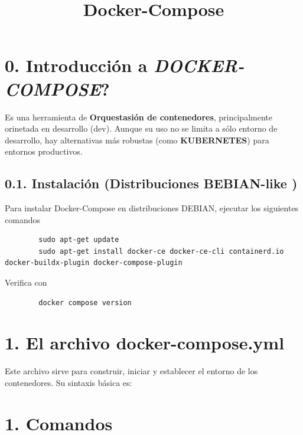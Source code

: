 \documentclass[a4paper,10pt]{article}
\title{Docker-Compose}
\date{}
\begin{document}
\maketitle


\section*{0. Introducción a \textit{DOCKER-COMPOSE}?}
Es una herramienta de \textbf{Orquestasión de contenedores}, principalmente orinetada en
desarrollo (dev). Aunque su uso no se limita a sólo entorno de desarrollo, hay alternativas más
robustas (como \textbf{KUBERNETES}) para entornos productivos. 

\subsection*{0.1. Instalación (Distribuciones BEBIAN-like )}
Para instalar Docker-Compose en distribuciones DEBIAN, ejecutar los siguientes comandos

\begin{center}
    \begin{lstlisting}
        sudo apt-get update
        sudo apt-get install docker-ce docker-ce-cli containerd.io docker-buildx-plugin docker-compose-plugin   
    \end{lstlisting}
\end{center}

Verifica con

\begin{center}
    \begin{lstlisting}
        docker compose version
    \end{lstlisting}    
\end{center}


\section*{1. El archivo docker-compose.yml}

Este archivo sirve para construir, iniciar y establecer el entorno de los contenedores.
Su sintaxis básica es:


\section*{1. Comandos}

\subsection{}
\end{document}
